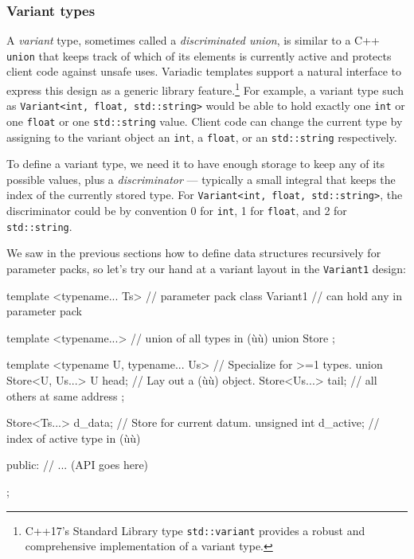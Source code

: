 \subsubsection[Variant types]{Variant types}\label{variant-types}

A \emph{variant} type, sometimes called a \emph{discriminated union}, is
similar to a C++ \lstinline!union! that keeps track of which of its
elements is currently active and protects client code against unsafe
uses. Variadic templates support a natural interface to express this
design as a generic library feature.{\cprotect\footnote{C++17's Standard
Library type \lstinline!std::variant! provides a robust and comprehensive
  implementation of a variant type.}} For example, a variant type such
as \lstinline!Variant<int,!~\lstinline!float,!~\lstinline!std::string>! would be
able to hold exactly one \lstinline!int! or one \lstinline!float! or one
\lstinline!std::string! value. Client code can change the current type by
assigning to the variant object an \lstinline!int!, a \lstinline!float!, or an
\lstinline!std::string! respectively.

To define a variant type, we need it to have enough storage to keep any
of its possible values, plus a \emph{discriminator} --- typically a
small integral that keeps the index of the currently stored type. For
\lstinline!Variant<int,!~\lstinline!float,!~\lstinline!std::string>!, the
discriminator could be by convention 0 for \lstinline!int!, 1 for
\lstinline!float!, and 2 for \lstinline!std::string!.

We saw in the previous sections how to define data structures
recursively for parameter packs, so let's try our hand at a variant
layout in the \lstinline!Variant1! design:

\begin{emcppslisting}
template <typename... Ts>                   // parameter pack
class Variant1                              // can hold any in parameter pack
{
    template <typename...>                  // union of all types in (ù{}ù)
    union Store {};

    template <typename U, typename... Us>   // Specialize for >=1 types.
    union Store<U, Us...>
    {
        U head;                             // Lay out a (ù{}ù) object.
        Store<Us...> tail;                  // all others at same address
    };

    Store<Ts...> d_data;                    // Store for current datum.
    unsigned int d_active;                  // index of active type in (ù{}ù)

public:
    // ... (API goes here)
};
\end{emcppslisting}
    

